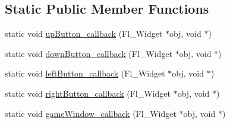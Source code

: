 \subsection*{Static Public Member Functions}
\begin{DoxyCompactItemize}
\item 
static void \hyperlink{classTileGrid_aa50de7f1238128fea9f07d7f5bd4b492}{up\+Button\+\_\+callback} (Fl\+\_\+\+Widget $\ast$obj, void $\ast$)
\item 
static void \hyperlink{classTileGrid_a6c2e41e7f4ed1a6872c712155ef99888}{down\+Button\+\_\+callback} (Fl\+\_\+\+Widget $\ast$obj, void $\ast$)
\item 
static void \hyperlink{classTileGrid_a8166f451ae77dcf4015cefbe2cc72a74}{left\+Button\+\_\+callback} (Fl\+\_\+\+Widget $\ast$obj, void $\ast$)
\item 
static void \hyperlink{classTileGrid_a2f95e4a1e0111c81c7eea715dd8cf030}{right\+Button\+\_\+callback} (Fl\+\_\+\+Widget $\ast$obj, void $\ast$)
\item 
static void \hyperlink{classTileGrid_a7c598f748da8a08d0bf2ef1d35d50fea}{game\+Window\+\_\+callback} (Fl\+\_\+\+Widget $\ast$obj, void $\ast$)
\end{DoxyCompactItemize}
